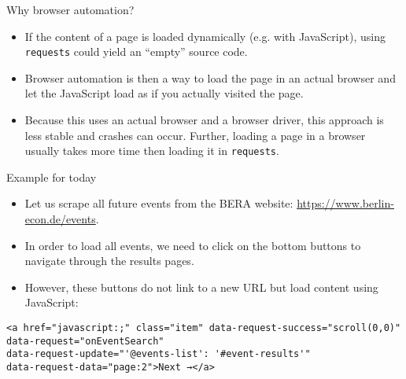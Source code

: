 \begin{frame}[fragile]{Why browser automation?}
\begin{itemize}
	\item If the content of a page is loaded dynamically (e.g. with JavaScript), using \texttt{requests} could yield an ``empty'' source code.
	\item Browser automation is then a way to load the page in an actual browser and let the JavaScript load as if you actually visited the page.
	\item Because this uses an actual browser and a browser driver, this approach is less stable and crashes can occur. Further, loading a page in a browser usually takes more time then loading it in \texttt{requests}.
\end{itemize}
\end{frame}

\begin{frame}[fragile]{Example for today}
\begin{itemize}
	\item Let us scrape all future events from the BERA website: \url{https://www.berlin-econ.de/events}.
	\item In order to load all events, we need to click on the bottom buttons to navigate through the results pages.
	\item However, these buttons do not link to a new URL but load content using JavaScript:
\end{itemize}
\begin{verbatim}
<a href="javascript:;" class="item" data-request-success="scroll(0,0)" 
data-request="onEventSearch" 
data-request-update="'@events-list': '#event-results'" 
data-request-data="page:2">Next →</a>
\end{verbatim}
\end{frame}

